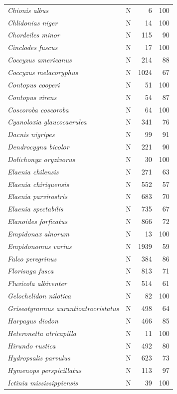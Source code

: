 \documentclass[
  oneside]{scrbook}
\begin{document}
\begin{longtable}[t]{>{}llrr}
\em{Chionis albus} & N & 6 & 100\\
\em{Chlidonias niger} & N & 14 & 100\\
\addlinespace
\em{Chordeiles minor} & N & 115 & 90\\
\em{Cinclodes fuscus} & N & 17 & 100\\
\em{Coccyzus americanus} & N & 214 & 88\\
\em{Coccyzus melacoryphus} & N & 1024 & 67\\
\em{Contopus cooperi} & N & 51 & 100\\
\addlinespace
\em{Contopus virens} & N & 54 & 87\\
\em{Coscoroba coscoroba} & N & 64 & 100\\
\em{Cyanoloxia glaucocaerulea} & N & 341 & 76\\
\em{Dacnis nigripes} & N & 99 & 91\\
\em{Dendrocygna bicolor} & N & 221 & 90\\
\addlinespace
\em{Dolichonyx oryzivorus} & N & 30 & 100\\
\em{Elaenia chilensis} & N & 271 & 63\\
\em{Elaenia chiriquensis} & N & 552 & 57\\
\em{Elaenia parvirostris} & N & 683 & 70\\
\em{Elaenia spectabilis} & N & 735 & 67\\
\addlinespace
\em{Elanoides forficatus} & N & 866 & 72\\
\em{Empidonax alnorum} & N & 13 & 100\\
\em{Empidonomus varius} & N & 1939 & 59\\
\em{Falco peregrinus} & N & 384 & 86\\
\em{Florisuga fusca} & N & 813 & 71\\
\addlinespace
\em{Fluvicola albiventer} & N & 514 & 61\\
\em{Gelochelidon nilotica} & N & 82 & 100\\
\em{Griseotyrannus aurantioatrocristatus} & N & 498 & 64\\
\em{Harpagus diodon} & N & 466 & 85\\
\em{Heteronetta atricapilla} & N & 11 & 100\\
\addlinespace
\em{Hirundo rustica} & N & 492 & 80\\
\em{Hydropsalis parvulus} & N & 623 & 73\\
\em{Hymenops perspicillatus} & N & 113 & 97\\
\em{Ictinia mississippiensis} & N & 39 & 100\\

\end{longtable}
\end{document}

